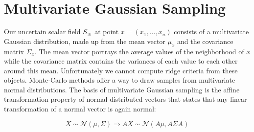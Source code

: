 \section{Multivariate Gaussian Sampling}\label{sec:MGS}

Our uncertain scalar field $S_{\mathcal{N}}$ at point
$x=(x_1,\dots,x_n)$ consists of a multivariate Gaussian distribution,
made up from the mean vector $\mu_x$ and the covariance matrix
$\Sigma_x$. The mean vector portrays the average values of the
neighborhood of $x$ while the covariance matrix contains the variances
of each value to each other around this mean. Unfortunately we cannot
compute ridge criteria from these objects. Monte-Carlo methods offer a
way to draw samples from multivariate normal distributions. The basis of
multivariate Gaussian sampling is the affine transformation property of
normal distributed vectors that states that any linear transformation of
a normal vector is again normal:

\begin{equation}
    X \sim \mathcal{N}(\mu,\Sigma) \Rightarrow AX \sim \mathcal{N}(A\mu, A\Sigma A)
\end{equation}

